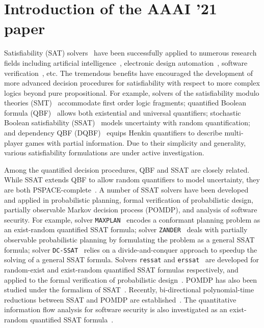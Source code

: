     \section{Introduction of the AAAI '21 paper}
    Satisfiability (SAT) solvers~\cite{SATHandbook} have been successfully applied to numerous research fields including artificial intelligence~\cite{Nilsson2014,Russell2020}, electronic design automation~\cite{Marques2000,Wang2009}, software verification~\cite{Jhala2009, Berard2013}, etc.
    The tremendous benefits have encouraged the development of more advanced decision procedures for satisfiability with respect to more complex logics beyond pure propositional.
    For example, solvers of the satisfiability modulo theories (SMT)~\cite{Moura2011,HBMC-SMT} accommodate first order logic fragments; quantified Boolean formula (QBF)~\cite{Narizzano2006,SATHandbook-QBF} allows both existential and universal quantifiers; stochastic Boolean satisfiability (SSAT)~\cite{Littman2001,SATHandbook-SSAT} models uncertainty with random quantification; and dependency QBF (DQBF)~\cite{Balabanov2014,Scholl2018} equips Henkin quantifiers to describe multi-player games with partial information.
    Due to their simplicity and generality, various satisfiability formulations are under active investigation.

    Among the quantified decision procedures, QBF and SSAT are closely related.
    While SSAT extends QBF to allow random quantifiers to model uncertainty, they are both PSPACE-complete~\cite{Stockmeyer1973}.
    A number of SSAT solvers have been developed and applied in probabilistic planning, formal verification of probabilistic design, partially observable Markov decision process (POMDP), and analysis of software security.
    For example, solver \texttt{MAXPLAN}~\cite{Majercik1998} encodes a conformant planning problem as an exist-random quantified SSAT formula; solver \texttt{ZANDER}~\cite{Majercik2003} deals with partially observable probabilistic planning by formulating the problem as a general SSAT formula; solver \texttt{DC-SSAT}~\cite{Majercik2005} relies on a divide-and-conquer approach to speedup the solving of a general SSAT formula.
    Solvers \texttt{ressat} and \texttt{erssat}~\cite{LeeIJCAI17RESSAT,LeeIJCAI18ERSSAT} are developed for random-exist and exist-random quantified SSAT formulas respectively, and applied to the formal verification of probabilistic design~\cite{LeeTC18ProbDesign}.
    POMDP has also been studied under the formalism of SSAT~\cite{Majercik2004,Salmon2020}.
    Recently, bi-directional polynomial-time reductions between SSAT and POMDP are established~\cite{Salmon2020}.
    The quantitative information flow analysis for software security is also investigated as an exist-random quantified SSAT formula~\cite{Fremont2017}.

